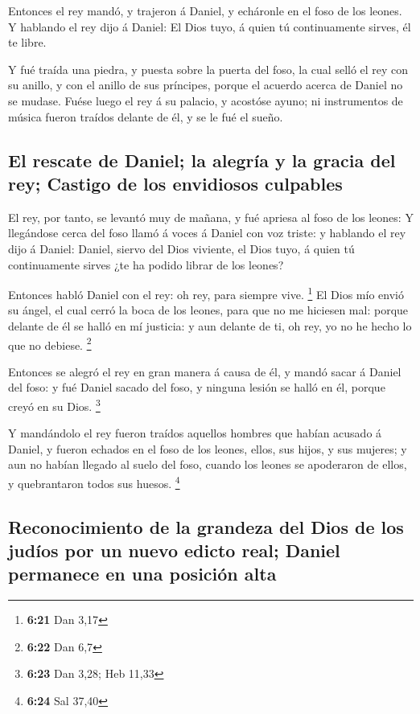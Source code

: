  Entonces el rey mandó, y trajeron á Daniel, y echáronle
en el foso de los leones. Y hablando el rey dijo á Daniel: El Dios tuyo,
á quien tú continuamente sirves, él te libre.

 Y fué traída una piedra, y puesta sobre la puerta del
foso, la cual selló el rey con su anillo, y con el anillo de sus
príncipes, porque el acuerdo acerca de Daniel no se mudase.
 Fuése luego el rey á su palacio, y acostóse ayuno; ni
instrumentos de música fueron traídos delante de él, y se le fué el
sueño.

\hypertarget{el-rescate-de-daniel-la-alegruxeda-y-la-gracia-del-rey-castigo-de-los-envidiosos-culpables}{%
\subsection{El rescate de Daniel; la alegría y la gracia del rey;
Castigo de los envidiosos
culpables}\label{el-rescate-de-daniel-la-alegruxeda-y-la-gracia-del-rey-castigo-de-los-envidiosos-culpables}}

 El rey, por tanto, se levantó muy de mañana, y fué
apriesa al foso de los leones:  Y llegándose cerca del
foso llamó á voces á Daniel con voz triste: y hablando el rey dijo á
Daniel: Daniel, siervo del Dios viviente, el Dios tuyo, á quien tú
continuamente sirves ¿te ha podido librar de los leones?

 Entonces habló Daniel con el rey: oh rey, para siempre
vive. \footnote{\textbf{6:21} Dan 3,17}  El Dios mío
envió su ángel, el cual cerró la boca de los leones, para que no me
hiciesen mal: porque delante de él se halló en mí justicia: y aun
delante de ti, oh rey, yo no he hecho lo que no debiese. \footnote{\textbf{6:22}
  Dan 6,7}

 Entonces se alegró el rey en gran manera á causa de él,
y mandó sacar á Daniel del foso: y fué Daniel sacado del foso, y ninguna
lesión se halló en él, porque creyó en su Dios. \footnote{\textbf{6:23}
  Dan 3,28; Heb 11,33}

 Y mandándolo el rey fueron traídos aquellos hombres que
habían acusado á Daniel, y fueron echados en el foso de los leones,
ellos, sus hijos, y sus mujeres; y aun no habían llegado al suelo del
foso, cuando los leones se apoderaron de ellos, y quebrantaron todos sus
huesos. \footnote{\textbf{6:24} Sal 37,40}

\hypertarget{reconocimiento-de-la-grandeza-del-dios-de-los-juduxedos-por-un-nuevo-edicto-real-daniel-permanece-en-una-posiciuxf3n-alta}{%
\subsection{Reconocimiento de la grandeza del Dios de los judíos por un
nuevo edicto real; Daniel permanece en una posición
alta}\label{reconocimiento-de-la-grandeza-del-dios-de-los-juduxedos-por-un-nuevo-edicto-real-daniel-permanece-en-una-posiciuxf3n-alta}}


